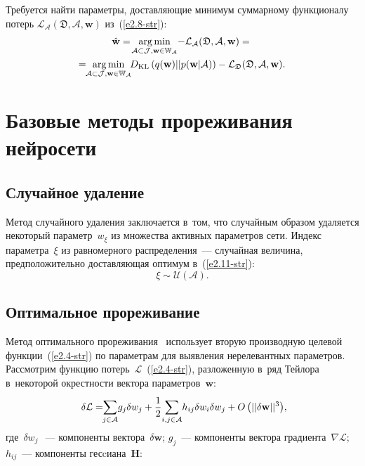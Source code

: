 \begin{multicols}{2}
Требуется найти параметры, достав\-ля\-ющие минимум суммарному функционалу 
потерь $\mathcal{L}_\mathcal{A}(\mathfrak{D},\mathcal{A},\mathbf{w})$ из~(\ref{e2.8-str}):
\begin{multline}
\hat{\mathbf{w}} =\! \argmin_{\mathcal{A}\subset\mathcal{J}, \mathbf{w} \in 
\mathbb{W_\mathcal{A}}} \!-\mathcal{L}_\mathcal{A}(\mathfrak{D}, \mathcal{A}, 
\mathbf{w}) = {}\\
\!\!{}=\!\!\argmin_{\mathcal{A}\subset\mathcal{J}, \mathbf{w} \in 
\mathbb{W_\mathcal{A}}} \!\!
D_{\mathrm{KL}}\left(q(\textbf{w})||p(\textbf{w}|\mathcal{A})\right) - 
\mathcal{L}_\mathfrak{D}(\mathfrak{D}, \mathcal{A}, \mathbf{w}). 
\label{e2.11-str}
\end{multline}



\section{Базовые методы прореживания нейросети}

\subsection{Случайное удаление}

Метод случайного удаления заключается в~том, что случайным образом удаляется 
некоторый параметр~$w_\xi$ из множества активных па\-ра\-мет\-ров сети.  Индекс 
па\-ра\-мет\-ра~$\xi$ из равномерного распределения~--- случайная величина, 
предположительно до\-став\-ля\-ющая оптимум в~(\ref{e2.11-str}):
\begin{equation*}
\xi \sim \mathcal{U}(\mathcal{A}). 
\end{equation*}

\subsection{Оптимальное прореживание}

Метод оптимального прореживания~\cite{cun1990} использует вторую производную 
целевой функции~(\ref{e2.4-str}) по па\-ра\-мет\-рам для выявления нерелевантных 
па\-ра\-мет\-ров. 
Рас\-смот\-рим функцию потерь~$\mathcal{L}$~(\ref{e2.4-str}), разложенную в~ряд Тейлора 
в~некоторой окрест\-ности вектора па\-ра\-мет\-ров~$\mathbf{w}$:
\begin{equation}
\delta \mathcal{L} = \!\!\sum\limits_{j\in \mathcal{A}} \!g_j\delta w_j + 
\fr{1}{2}\!\sum\limits_{i,j\in \mathcal{A}} \! h_{ij}\delta w_i\delta w_j + 
O\left(||\delta\mathbf{w}||^3\right)\!,
\!\! \label{e3.2.1-str}
\end{equation}
где~$\delta w_j~$~--- компоненты вектора~$\delta\mathbf{w}$; $g_j$~--- 
компоненты вектора градиента~$\nabla \mathcal{L}$; $h_{ij}$~--- компоненты 
гесcиана~$\mathbf{H}$:


\end{multicols}
